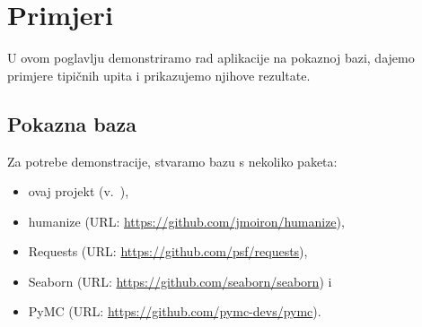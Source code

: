 \section{Primjeri}
U ovom poglavlju demonstriramo rad aplikacije na pokaznoj bazi,
dajemo primjere tipičnih upita i prikazujemo njihove rezultate.

\subsection{Pokazna baza} \label{subsec:pokazna}
Za potrebe demonstracije, stvaramo bazu s nekoliko
paketa:
\begin{itemize}
\item ovaj projekt (v.~\cite{repo}),
\item humanize (URL: \url{https://github.com/jmoiron/humanize}),
\item Requests (URL: \url{https://github.com/psf/requests}),
\item Seaborn (URL: \url{https://github.com/seaborn/seaborn}) i
\item PyMC (URL: \url{https://github.com/pymc-devs/pymc}).
\end{itemize}

